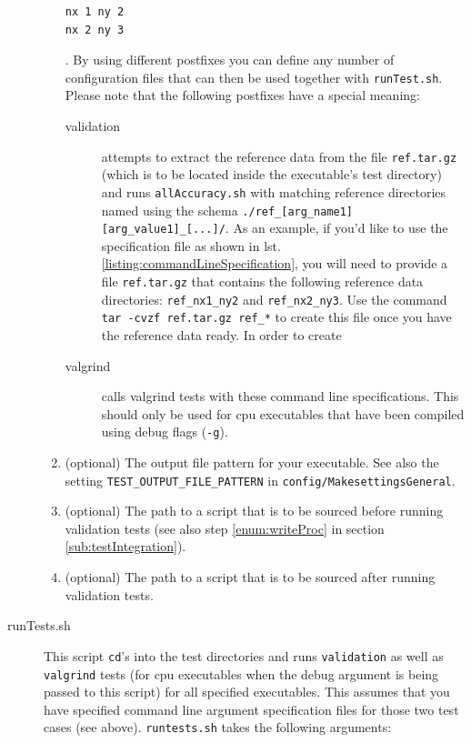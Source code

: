 \begin{description}
\begin{enumerate}
\begin{lstlisting}[name=commandLineSpecification, label=listing:commandLineSpecification, caption={A sample command line argument specification file}]
nx 1 ny 2
nx 2 ny 3
\end{lstlisting}. By using different postfixes you can define any number of configuration files that can then be used together with \verb|runTest.sh|. Please note that the following postfixes have a special meaning:
    \begin{description}
     \item [validation] attempts to extract the reference data from the file \verb|ref.tar.gz| (which is to be located inside the executable's test directory) and runs \verb|allAccuracy.sh| with matching reference directories named using the schema \verb|./ref_[arg_name1][arg_value1]_[...]/|. As an example, if you'd like to use the specification file as shown in lst. \ref{listing:commandLineSpecification}, you will need to provide a file \verb|ref.tar.gz| that contains the following reference data directories: \verb|ref_nx1_ny2| and \verb|ref_nx2_ny3|. Use the command \verb|tar -cvzf ref.tar.gz ref_*| to create this file once you have the reference data ready. In order to create
     \item [valgrind] calls valgrind tests with these command line specifications. This should only be used for cpu executables that have been compiled using debug flags (\verb|-g|).
    \end{description}
   \item (optional) The output file pattern for your executable. See also the setting \verb|TEST_OUTPUT_FILE_PATTERN| in \verb|config/MakesettingsGeneral|.
   \item (optional) The path to a script that is to be sourced before running validation tests (see also step \ref{enum:writeProc} in section \ref{sub:testIntegration}).
   \item (optional) The path to a script that is to be sourced after running validation tests.
  \end{enumerate}
 \item [runTests.sh] This script \verb|cd|'s into the test directories and runs \verb|validation| as well as \verb|valgrind| tests (for cpu executables when the debug argument is being passed to this script) for all specified executables. This assumes that you have specified command line argument specification files for those two test cases (see above). \verb|runtests.sh| takes the following arguments:
  \begin{enumerate}

\end{enumerate}
\end{description}
